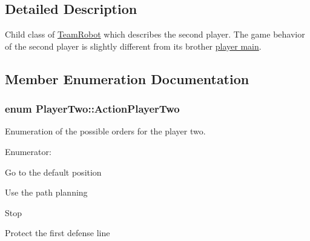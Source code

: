 \subsection{Detailed Description}
Child class of \hyperlink{classTeamRobot}{TeamRobot} which describes the second player. The game behavior of the second player is slightly different from its brother \hyperlink{classPlayerMain}{player main}. 

\subsection{Member Enumeration Documentation}
\hypertarget{classPlayerTwo_a6dd2b1afb179fe02b677dd71ec5703d2}{
\subsubsection[{ActionPlayerTwo}]{\setlength{\rightskip}{0pt plus 5cm}enum {\bf PlayerTwo::ActionPlayerTwo}}}
\label{classPlayerTwo_a6dd2b1afb179fe02b677dd71ec5703d2}


Enumeration of the possible orders for the player two. 

\begin{Desc}
\item[Enumerator: ]\par
\begin{description}
\item[{\em 
\hypertarget{classPlayerTwo_a6dd2b1afb179fe02b677dd71ec5703d2a1ee0927d53a79a9c07f3e8347b65ec6e}{
GO\_\-TO\_\-DEF\_\-POS}
\label{classPlayerTwo_a6dd2b1afb179fe02b677dd71ec5703d2a1ee0927d53a79a9c07f3e8347b65ec6e}
}]Go to the default position \item[{\em 
\hypertarget{classPlayerTwo_a6dd2b1afb179fe02b677dd71ec5703d2abd5fef2f14d18f78f33c6e946f1c9cd7}{
FOLLOWPATH}
\label{classPlayerTwo_a6dd2b1afb179fe02b677dd71ec5703d2abd5fef2f14d18f78f33c6e946f1c9cd7}
}]Use the path planning \item[{\em 
\hypertarget{classPlayerTwo_a6dd2b1afb179fe02b677dd71ec5703d2aebb0cbac0bcb8fb7439a980dcc792638}{
STOP}
\label{classPlayerTwo_a6dd2b1afb179fe02b677dd71ec5703d2aebb0cbac0bcb8fb7439a980dcc792638}
}]Stop \item[{\em 
\hypertarget{classPlayerTwo_a6dd2b1afb179fe02b677dd71ec5703d2a891b5407c8423ecb7d65df3a7da9b334}{
DEFENSE}
\label{classPlayerTwo_a6dd2b1afb179fe02b677dd71ec5703d2a891b5407c8423ecb7d65df3a7da9b334}
}]Protect the first defense line \end{description}
\end{Desc}




